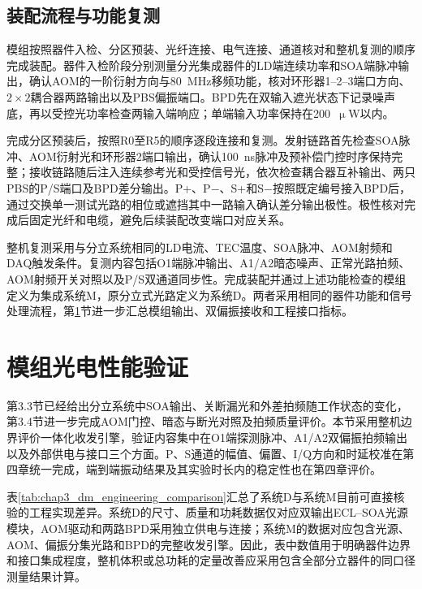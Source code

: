 \subsection{装配流程与功能复测}

模组按照器件入检、分区预装、光纤连接、电气连接、通道核对和整机复测的顺序完成装配。器件入检阶段分别测量分光集成器件的LD端连续功率和SOA端脉冲输出，确认AOM的一阶衍射方向与80~MHz移频功能，核对环形器1--2--3端口方向、$2\times2$耦合器两路输出以及PBS偏振端口。BPD先在双输入遮光状态下记录噪声底，再以受控光功率检查两输入端响应；单端输入功率保持在200~$\upmu$W以内。

完成分区预装后，按照R0至R5的顺序逐段连接和复测。发射链路首先检查SOA脉冲、AOM衍射光和环形器2端口输出，确认100~ns脉冲及预补偿门控时序保持完整；接收链路随后注入连续参考光和受控信号光，依次检查耦合器互补输出、两只PBS的P/S端口及BPD差分输出。P+、P$-$、S+和S$-$按照既定编号接入BPD后，通过交换单一测试光路的相位或遮挡其中一路输入确认差分输出极性。极性核对完成后固定光纤和电缆，避免后续装配改变端口对应关系。

整机复测采用与分立系统相同的LD电流、TEC温度、SOA脉冲、AOM射频和DAQ触发条件。复测内容包括O1端脉冲输出、A1/A2暗态噪声、正常光路拍频、AOM射频开关对照以及P/S双通道同步性。完成装配并通过上述功能检查的模组定义为集成系统M，原分立式光路定义为系统D。两者采用相同的器件功能和信号处理流程，第\ref{sec:chap3_hardware_comparison}节进一步汇总模组输出、双偏振接收和工程接口指标。

\section{模组光电性能验证}
\label{sec:chap3_hardware_comparison}

第3.3节已经给出分立系统中SOA输出、关断漏光和外差拍频随工作状态的变化，第3.4节进一步完成AOM门控、暗态与断光对照及拍频质量评价。本节采用整机边界评价一体化收发引擎，验证内容集中在O1端探测脉冲、A1/A2双偏振拍频输出以及外部供电与接口三个方面。P、S通道的幅值、偏置、I/Q方向和时延校准在第四章统一完成，端到端振动结果及其实验时长内的稳定性也在第四章评价。

表\ref{tab:chap3_dm_engineering_comparison}汇总了系统D与系统M目前可直接核验的工程实现差异。系统D的尺寸、质量和功耗数据仅对应双输出ECL--SOA光源模块，AOM驱动和两路BPD采用独立供电与连接；系统M的数据对应包含光源、AOM、偏振分集光路和BPD的完整收发引擎。因此，表中数值用于明确器件边界和接口集成程度，整机体积或总功耗的定量改善应采用包含全部分立器件的同口径测量结果计算。

